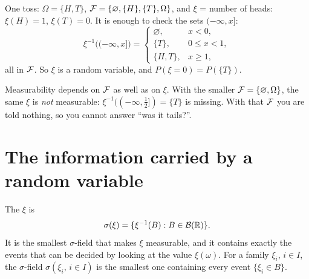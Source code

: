 \begin{pic}
\end{pic}

\begin{example}
\label{ex:heads}
One toss: $\Omega=\{H,T\}$, $\mathcal F=\{\varnothing,\{H\},\{T\},\Omega\}$, and $\xi$ = number of heads: $\xi(H)=1$, $\xi(T)=0$. It is enough to check the sets $(-\infty,x]$:
\[
  \xi^{-1}\big((-\infty,x]\big)=\begin{cases}\varnothing,&x<0,\\ \{T\},&0\le x<1,\\ \{H,T\},&x\ge1,\end{cases}
\]
all in $\mathcal F$. So $\xi$ is a random variable, and $P(\xi=0)=P(\{T\})$.
\end{example}

Measurability depends on $\mathcal F$ as well as on $\xi$. With the smaller $\mathcal F=\{\varnothing,\Omega\}$, the same $\xi$ is \emph{not} measurable: $\xi^{-1}((-\infty,\frac12])=\{T\}$ is missing. With that $\mathcal F$ you are told nothing, so you cannot answer ``was it tails?''.

\section{The information carried by a random variable}

\begin{definition}
\label{def:sigma-xi}
The  $\xi$ is
\[
  \sigma(\xi)=\{\xi^{-1}(B):B\in\mathcal B(\mathbb{R})\}.
\]
It is the smallest $\sigma$-field that makes $\xi$ measurable, and it contains exactly the events that can be decided by looking at the value $\xi(\omega)$. For a family $\xi_i$, $i\in I$, the $\sigma$-field $\sigma(\xi_i,\,i\in I)$ is the smallest one containing every event $\{\xi_i\in B\}$.
\end{definition}

